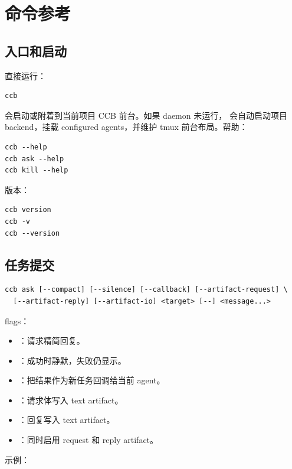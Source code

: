 \chapter{命令参考}

\section{入口和启动}

直接运行：

\begin{lstlisting}
ccb
\end{lstlisting}

会启动或附着到当前项目 CCB 前台。如果 daemon 未运行， 会自动启动项目 backend，挂载 configured agents，并维护 tmux 前台布局。帮助：

\begin{lstlisting}
ccb --help
ccb ask --help
ccb kill --help
\end{lstlisting}

版本：

\begin{lstlisting}
ccb version
ccb -v
ccb --version
\end{lstlisting}

\section{任务提交}

\begin{lstlisting}
ccb ask [--compact] [--silence] [--callback] [--artifact-request] \
  [--artifact-reply] [--artifact-io] <target> [--] <message...>
\end{lstlisting}

flags：

\begin{itemize}
  \item {}：请求精简回复。
  \item {}：成功时静默，失败仍显示。
  \item {}：把结果作为新任务回调给当前 agent。
  \item {}：请求体写入 text artifact。
  \item {}：回复写入 text artifact。
  \item {}：同时启用 request 和 reply artifact。
\end{itemize}

示例：

